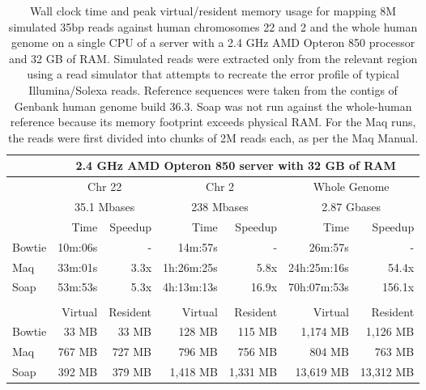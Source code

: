 \documentclass[letterpaper]{article}
\begin{document}
\begin{table}[tp]
\scriptsize
\begin{tabular}{lrrrrrr}
 & \multicolumn{6}{c}{2.4 GHz AMD Opteron 850 server with 32 GB of RAM} \\[3pt] 
\toprule
 & \multicolumn{2}{c}{Chr 22} & \multicolumn{2}{c}{Chr 2} & \multicolumn{2}{c}{Whole Genome} \\[3pt] 
 & \multicolumn{2}{c}{35.1 Mbases} & \multicolumn{2}{c}{238 Mbases} & \multicolumn{2}{c}{2.87 Gbases} \\[3pt] 
 & Time & Speedup & Time & Speedup & Time & Speedup \\ 
\toprule
Bowtie & 10m:06s & - & 14m:57s & - & 26m:57s & -  \\ \midrule 
Maq & 33m:01s & 3.3x & 1h:26m:25s & 5.8x & 24h:25m:16s & 54.4x  \\ \midrule 
Soap & 53m:53s & 5.3x & 4h:13m:13s & 16.9x & 70h:07m:53s & 156.1x  \\[2pt] \bottomrule \\ 
 & Virtual & Resident & Virtual & Resident & Virtual & Resident \\ 
\toprule
Bowtie & 33 MB & 33 MB & 128 MB & 115 MB & 1,174 MB & 1,126 MB  \\ \midrule 
Maq & 767 MB & 727 MB & 796 MB & 756 MB & 804 MB & 763 MB  \\ \midrule 
Soap & 392 MB & 379 MB & 1,418 MB & 1,331 MB & 13,619 MB & 13,312 MB  \\ 
\bottomrule
\end{tabular}
\scriptsize\caption{Wall clock time and peak virtual/resident memory usage for mapping 8M simulated 35bp reads against human chromosomes 22 and 2 and the whole human genome on a single CPU of a server with a 2.4 GHz AMD Opteron 850 processor and 32 GB of RAM. Simulated reads were extracted only from the relevant region using a read simulator that attempts to recreate the error profile of typical Illumina/Solexa reads. Reference sequences were taken from the contigs of Genbank human genome build 36.3. Soap was not run against the whole-human reference because its memory footprint exceeds physical RAM. For the Maq runs, the reads were first divided into chunks of 2M reads each, as per the Maq Manual.}
\end{table}
\end{document}
